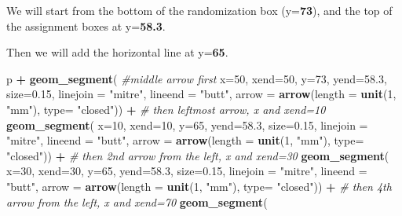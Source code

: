 \documentclass[
]{book}
\newenvironment{Shaded}{\begin{snugshade}}{\end{snugshade}}
\newcommand{\CommentTok}[1]{\textcolor[rgb]{0.56,0.35,0.01}{\textit{#1}}}
\newcommand{\DataTypeTok}[1]{\textcolor[rgb]{0.13,0.29,0.53}{#1}}
\newcommand{\DecValTok}[1]{\textcolor[rgb]{0.00,0.00,0.81}{#1}}
\newcommand{\FloatTok}[1]{\textcolor[rgb]{0.00,0.00,0.81}{#1}}
\newcommand{\KeywordTok}[1]{\textcolor[rgb]{0.13,0.29,0.53}{\textbf{#1}}}
\newcommand{\NormalTok}[1]{#1}
\newcommand{\OperatorTok}[1]{\textcolor[rgb]{0.81,0.36,0.00}{\textbf{#1}}}
\newcommand{\StringTok}[1]{\textcolor[rgb]{0.31,0.60,0.02}{#1}}
\begin{document}
We will start from the bottom of the randomization box (y=\textbf{73}),
and the top of the assignment boxes at y=\textbf{58.3}.

Then we will add the horizontal line at y=\textbf{65}.

\begin{Shaded}
\begin{Highlighting}[]
\NormalTok{p }\OperatorTok{+}
\StringTok{  }\KeywordTok{geom_segment}\NormalTok{(}
  \CommentTok{#middle arrow first}
    \DataTypeTok{x=}\DecValTok{50}\NormalTok{, }\DataTypeTok{xend=}\DecValTok{50}\NormalTok{, }\DataTypeTok{y=}\DecValTok{73}\NormalTok{, }\DataTypeTok{yend=}\FloatTok{58.3}\NormalTok{, }
    \DataTypeTok{size=}\FloatTok{0.15}\NormalTok{, }\DataTypeTok{linejoin =} \StringTok{"mitre"}\NormalTok{, }\DataTypeTok{lineend =} \StringTok{"butt"}\NormalTok{,}
    \DataTypeTok{arrow =} \KeywordTok{arrow}\NormalTok{(}\DataTypeTok{length =} \KeywordTok{unit}\NormalTok{(}\DecValTok{1}\NormalTok{, }\StringTok{"mm"}\NormalTok{), }\DataTypeTok{type=} \StringTok{"closed"}\NormalTok{)) }\OperatorTok{+}
\StringTok{  }\CommentTok{# then leftmost arrow, x and xend=10}
\StringTok{  }\KeywordTok{geom_segment}\NormalTok{(}
    \DataTypeTok{x=}\DecValTok{10}\NormalTok{, }\DataTypeTok{xend=}\DecValTok{10}\NormalTok{, }\DataTypeTok{y=}\DecValTok{65}\NormalTok{, }\DataTypeTok{yend=}\FloatTok{58.3}\NormalTok{, }
    \DataTypeTok{size=}\FloatTok{0.15}\NormalTok{, }\DataTypeTok{linejoin =} \StringTok{"mitre"}\NormalTok{, }\DataTypeTok{lineend =} \StringTok{"butt"}\NormalTok{,}
    \DataTypeTok{arrow =} \KeywordTok{arrow}\NormalTok{(}\DataTypeTok{length =} \KeywordTok{unit}\NormalTok{(}\DecValTok{1}\NormalTok{, }\StringTok{"mm"}\NormalTok{), }\DataTypeTok{type=} \StringTok{"closed"}\NormalTok{)) }\OperatorTok{+}
\StringTok{  }\CommentTok{# then 2nd arrow from the left, x and xend=30}
\StringTok{  }\KeywordTok{geom_segment}\NormalTok{(}
    \DataTypeTok{x=}\DecValTok{30}\NormalTok{, }\DataTypeTok{xend=}\DecValTok{30}\NormalTok{, }\DataTypeTok{y=}\DecValTok{65}\NormalTok{, }\DataTypeTok{yend=}\FloatTok{58.3}\NormalTok{, }
    \DataTypeTok{size=}\FloatTok{0.15}\NormalTok{, }\DataTypeTok{linejoin =} \StringTok{"mitre"}\NormalTok{, }\DataTypeTok{lineend =} \StringTok{"butt"}\NormalTok{,}
    \DataTypeTok{arrow =} \KeywordTok{arrow}\NormalTok{(}\DataTypeTok{length =} \KeywordTok{unit}\NormalTok{(}\DecValTok{1}\NormalTok{, }\StringTok{"mm"}\NormalTok{), }\DataTypeTok{type=} \StringTok{"closed"}\NormalTok{)) }\OperatorTok{+}
\StringTok{  }\CommentTok{# then 4th arrow from the left, x and xend=70}
\StringTok{  }\KeywordTok{geom_segment}\NormalTok{(}

\end{Highlighting}
\end{Shaded}
\end{document}
